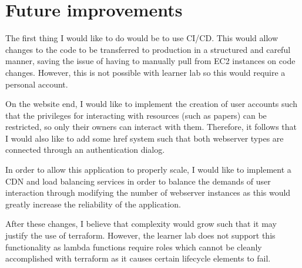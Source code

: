 \documentclass[12pt]{article}
\begin{document}

\section{Future improvements}

The first thing I would like to do would be to use CI/CD. This would allow changes to the code to be transferred to production in a structured and careful manner, saving the issue of having to manually pull from EC2 instances on code changes. However, this is not possible with learner lab so this would require a personal account.

On the website end, I would like to implement the creation of user accounts such that the privileges for interacting with resources (such as papers) can be restricted, so only their owners can interact with them. Therefore, it follows that I would also like to add some href system such that both webserver types are connected through an authentication dialog. 

In order to allow this application to properly scale, I would like to implement a CDN and load balancing services in order to balance the demands of user interaction through modifying the number of webserver instances as this would greatly increase the reliability of the application. 

After these changes, I believe that complexity would grow such that it may justify the use of terraform. However, the learner lab does not support this functionality as lambda functions require roles which cannot be cleanly accomplished with terraform as it causes certain lifecycle elements to fail. 
\end{document}
